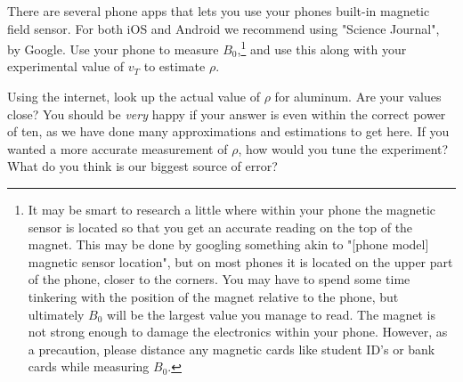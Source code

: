 \documentclass[%
oneside,                 %
final,                   %
10pt]{article}
\begin{document}
There are several phone apps that lets you use your phones built-in magnetic field sensor. For both iOS and Android we recommend using "Science Journal", by Google. Use your phone to measure $B_0$,\footnote{It may be smart to research a little where within your phone the magnetic sensor is located so that you get an accurate reading on the top of the magnet. This may be done by googling something akin to "[phone model] magnetic sensor location", but on most phones it is located on the upper part of the phone, closer to the corners. You may have to spend some time tinkering with the position of the magnet relative to the phone, but ultimately $B_0$ will be the largest value you manage to read. The magnet is not strong enough to damage the electronics within your phone. However, as a precaution, please distance any magnetic cards like student ID's or bank cards while measuring $B_0$.} and use this
along with your experimental value of $v_T$ to estimate $\rho$.

Using the internet, look up the actual value of $\rho$ for aluminum. Are your values close? You should be \textit{very} happy if your answer is even within the correct power of ten, as we have done many approximations and estimations to get here.
If you wanted a more accurate measurement of $\rho$, how would you tune the experiment? What do you think is our biggest source of error?


\end{document}
